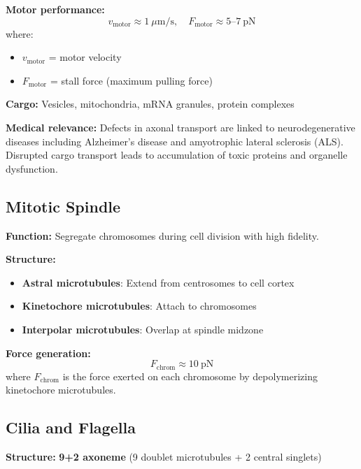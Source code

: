 \textbf{Motor performance:}
\begin{equation}
v_{\mathrm{motor}} \approx 1\ \mu\mathrm{m/s}, \quad F_{\mathrm{motor}} \approx 5\text{--}7\ \mathrm{pN}
\end{equation}
where:
\begin{itemize}
\item $v_{\mathrm{motor}}$ = motor velocity
\item $F_{\mathrm{motor}}$ = stall force (maximum pulling force)
\end{itemize}

\textbf{Cargo:} Vesicles, mitochondria, mRNA granules, protein complexes

\begin{importantbox}
\textbf{Medical relevance:} Defects in axonal transport are linked to neurodegenerative diseases including Alzheimer's disease and amyotrophic lateral sclerosis (ALS). Disrupted cargo transport leads to accumulation of toxic proteins and organelle dysfunction.
\end{importantbox}

\subsection{Mitotic Spindle}

\textbf{Function:} Segregate chromosomes during cell division with high fidelity.

\textbf{Structure:}
\begin{itemize}
\item \textbf{Astral microtubules}: Extend from centrosomes to cell cortex
\item \textbf{Kinetochore microtubules}: Attach to chromosomes
\item \textbf{Interpolar microtubules}: Overlap at spindle midzone
\end{itemize}

\textbf{Force generation:}
\begin{equation}
F_{\mathrm{chrom}} \approx 10\ \mathrm{pN}
\end{equation}
where $F_{\mathrm{chrom}}$ is the force exerted on each chromosome by depolymerizing kinetochore microtubules.

\subsection{Cilia and Flagella}

\textbf{Structure:} \textbf{9+2 axoneme} (9 doublet microtubules + 2 central singlets)

